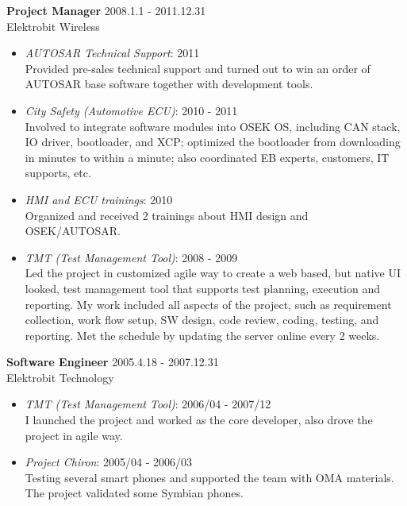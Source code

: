 \textbf{Project Manager} \hfill 2008.1.1 - 2011.12.31 \\
        Elektrobit Wireless
        \begin{itemize}  \itemsep -2pt %
            \item {\em AUTOSAR Technical Support}: 2011 \\
                    Provided pre-sales technical support
                    and turned out to win an order of AUTOSAR base software together with development tools.
            \item {\em City Safety (Automotive ECU)}: 2010 - 2011 \\
                    Involved to integrate software modules into OSEK OS,
                    including CAN stack, IO driver, bootloader, and XCP;
                    optimized the bootloader from downloading in minutes to within a minute;
                    also coordinated EB experts, customers, IT supports, etc.
            \item {\em HMI and ECU trainings}: 2010\\
                Organized and received 2 trainings about HMI design and OSEK/AUTOSAR.
            \item {\em TMT (Test Management Tool)}: 2008 - 2009 \\
                    Led the project in customized agile way
                    to create a web based, but native UI looked, test management tool
                    that supports test planning, execution and reporting.
                    My work included all aspects of the project,
                    such as requirement collection, work flow setup, SW design, code review, coding, testing, and reporting.
                    Met the schedule by updating the server online every 2 weeks.
        \end{itemize}
 
\textbf{Software Engineer} \hfill 2005.4.18 - 2007.12.31 \\
        Elektrobit Technology
        \begin{itemize}  \itemsep -2pt %
            \item {\em TMT (Test Management Tool)}: 2006/04 - 2007/12 \\ 
            I launched the project and worked as the core developer, also drove
            the project in agile way.
            \item {\em Project Chiron}: 2005/04 - 2006/03 \\
                Testing several smart phones and supported the team with OMA materials.
                The project validated some Symbian phones.
        \end{itemize}
 
